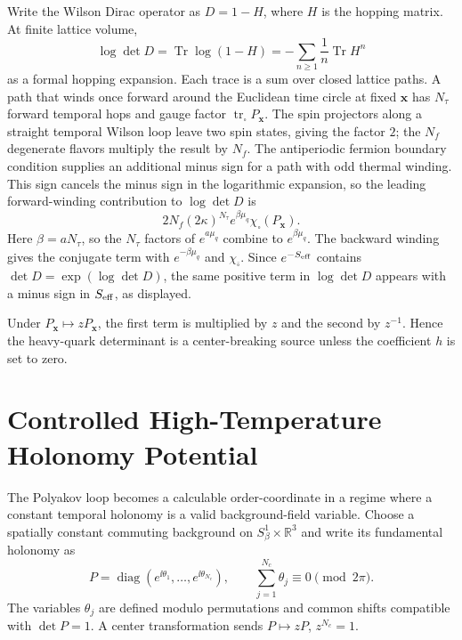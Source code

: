 Write the Wilson Dirac operator as \(D=1-H\), where \(H\) is the hopping
matrix.  At finite lattice volume,
\[
  \log\det D
  =
  \operatorname{Tr}\log(1-H)
  =
  -\sum_{n\ge1}\frac1n\operatorname{Tr}H^n
\]
as a formal hopping expansion.  Each trace is a sum over closed lattice
paths.  A path that winds once forward around the Euclidean time circle at
fixed \(\mathbf x\) has \(N_\tau\) forward temporal hops and gauge factor
\(\operatorname{tr}_{\square}P_{\mathbf x}\).  The spin projectors along a
straight temporal Wilson loop leave two spin states, giving the factor \(2\);
the \(N_f\) degenerate flavors multiply the result by \(N_f\).  The
antiperiodic fermion boundary condition supplies an additional minus sign
for a path with odd thermal winding.  This sign cancels the minus sign in
the logarithmic expansion, so the leading forward-winding contribution to
\(\log\det D\) is
\[
  2N_f(2\kappa)^{N_\tau}e^{\beta\mu_q}
  \chi_{\square}(P_{\mathbf x}).
\]
Here \(\beta=aN_\tau\), so the \(N_\tau\) factors of \(e^{a\mu_q}\) combine
to \(e^{\beta\mu_q}\).  The backward winding gives the conjugate term with
\(e^{-\beta\mu_q}\) and \(\chi_{\overline\square}\).  Since
\(e^{-S_{\rm eff}}\) contains \(\det D=\exp(\log\det D)\), the same positive
term in \(\log\det D\) appears with a minus sign in \(S_{\rm eff}\), as
displayed.

Under \(P_{\mathbf x}\mapsto zP_{\mathbf x}\), the first term is multiplied
by \(z\) and the second by \(z^{-1}\).  Hence the heavy-quark determinant is
a center-breaking source unless the coefficient \(h\) is set to zero.

\section{Controlled High-Temperature Holonomy Potential}
\label{sec:qcd-weiss-polyakov-holonomy-potential}

The Polyakov loop becomes a calculable order-coordinate in a regime where a
constant temporal holonomy is a valid background-field variable.  Choose a
spatially constant commuting background on
\(S^1_\beta\times\mathbb R^3\) and write its fundamental holonomy as
\begin{equation}
  P=\operatorname{diag}\left(e^{\ii\theta_1},\ldots,e^{\ii\theta_{N_c}}\right),
  \qquad
  \sum_{j=1}^{N_c}\theta_j\equiv0\pmod {2\pi}.
  \label{eq:qcd-weiss-holonomy-eigenphases}
\end{equation}
The variables \(\theta_j\) are defined modulo permutations and common shifts
compatible with \(\det P=1\).  A center transformation sends
\(P\mapsto zP\), \(z^{N_c}=1\).

